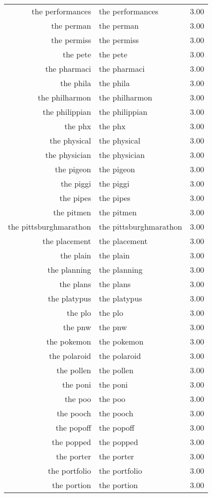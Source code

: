 \begin{table}[ht]
\begin{tabular}{rlr}
  the performances & the performances & 3.00 \\ 
  the perman & the perman & 3.00 \\ 
  the permiss & the permiss & 3.00 \\ 
  the pete & the pete & 3.00 \\ 
  the pharmaci & the pharmaci & 3.00 \\ 
  the phila & the phila & 3.00 \\ 
  the philharmon & the philharmon & 3.00 \\ 
  the philippian & the philippian & 3.00 \\ 
  the phx & the phx & 3.00 \\ 
  the physical & the physical & 3.00 \\ 
  the physician & the physician & 3.00 \\ 
  the pigeon & the pigeon & 3.00 \\ 
  the piggi & the piggi & 3.00 \\ 
  the pipes & the pipes & 3.00 \\ 
  the pitmen & the pitmen & 3.00 \\ 
  the pittsburghmarathon & the pittsburghmarathon & 3.00 \\ 
  the placement & the placement & 3.00 \\ 
  the plain & the plain & 3.00 \\ 
  the planning & the planning & 3.00 \\ 
  the plans & the plans & 3.00 \\ 
  the platypus & the platypus & 3.00 \\ 
  the plo & the plo & 3.00 \\ 
  the pnw & the pnw & 3.00 \\ 
  the pokemon & the pokemon & 3.00 \\ 
  the polaroid & the polaroid & 3.00 \\ 
  the pollen & the pollen & 3.00 \\ 
  the poni & the poni & 3.00 \\ 
  the poo & the poo & 3.00 \\ 
  the pooch & the pooch & 3.00 \\ 
  the popoff & the popoff & 3.00 \\ 
  the popped & the popped & 3.00 \\ 
  the porter & the porter & 3.00 \\ 
  the portfolio & the portfolio & 3.00 \\ 
  the portion & the portion & 3.00 \\ 

\end{tabular}
\end{table}
